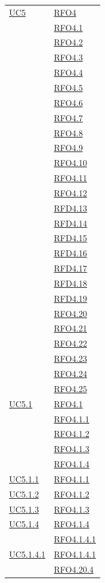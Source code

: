 \begin{longtable}{|>{\centering}m{5cm}|m{5cm}<{\centering}|}
\hyperref[UC5]{UC5} & \hyperlink{RFO4}{RFO4}\\
& \hyperlink{RFO4.1}{RFO4.1}\\
& \hyperlink{RFO4.2}{RFO4.2}\\
& \hyperlink{RFO4.3}{RFO4.3}\\
& \hyperlink{RFO4.4}{RFO4.4}\\
& \hyperlink{RFO4.5}{RFO4.5}\\
& \hyperlink{RFO4.6}{RFO4.6}\\
& \hyperlink{RFO4.7}{RFO4.7}\\
& \hyperlink{RFO4.8}{RFO4.8}\\
& \hyperlink{RFO4.9}{RFO4.9}\\
& \hyperlink{RFO4.10}{RFO4.10}\\
& \hyperlink{RFO4.11}{RFO4.11}\\
& \hyperlink{RFO4.12}{RFO4.12}\\
& \hyperlink{RFD4.13}{RFD4.13}\\
& \hyperlink{RFD4.14}{RFD4.14}\\
& \hyperlink{RFD4.15}{RFD4.15}\\
& \hyperlink{RFD4.16}{RFD4.16}\\
& \hyperlink{RFD4.17}{RFD4.17}\\

& \hyperlink{RFD4.18}{RFD4.18}\\
& \hyperlink{RFD4.18}{RFD4.19}\\
& \hyperlink{RFD4.18}{RFO4.20}\\
& \hyperlink{RFD4.18}{RFO4.21}\\
& \hyperlink{RFD4.18}{RFO4.22}\\
& \hyperlink{RFD4.18}{RFO4.23}\\
& \hyperlink{RFD4.18}{RFO4.24}\\
& \hyperlink{RFD4.18}{RFO4.25}\\ \hline
\hyperref[UC5.1]{UC5.1} & \hyperlink{RFO4.1}{RFO4.1}\\
& \hyperlink{RFO4.1.1}{RFO4.1.1}\\
& \hyperlink{RFO4.1.2}{RFO4.1.2}\\
& \hyperlink{RFO4.1.3}{RFO4.1.3}\\
& \hyperlink{RFO4.1.4}{RFO4.1.4}\\ \hline
\hyperref[UC5.1.1]{UC5.1.1} & \hyperlink{RFO4.1.1}{RFO4.1.1}\\ \hline
\hyperref[UC5.1.2]{UC5.1.2} & \hyperlink{RFO4.1.2}{RFO4.1.2}\\ \hline
\hyperref[UC5.1.3]{UC5.1.3} & \hyperlink{RFO4.1.3}{RFO4.1.3}\\ \hline
\hyperref[UC5.1.4]{UC5.1.4} & \hyperlink{RFO4.1.4}{RFO4.1.4}\\
& \hyperlink{RFO4.1.4.1}{RFO4.1.4.1}\\ \hline
\hyperref[UC5.1.4.1]{UC5.1.4.1} & \hyperlink{RFO4.1.4.1}{RFO4.1.4.1}\\ & \hyperlink{RFO4.20.4}{RFO4.20.4}\\ \hline


\end{longtable}
